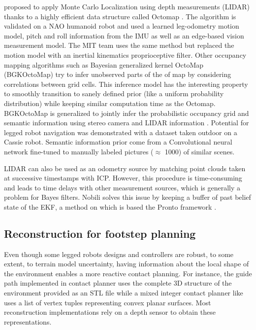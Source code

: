 \cite{hornung2014monte} proposed to apply Monte Carlo Localization using depth measurements (LIDAR) thanks to a highly efficient data structure called Octomap \cite{hornung2013octomap}.
The algorithm is validated on a NAO humanoid robot and used a learned leg-odometry motion model, pitch and roll information from the IMU as well as an edge-based vision measurement model.
The MIT team \cite{fallon2014drift} uses the same method but replaced the motion model with an inertial kinematics proprioceptive filter. Other occupancy mapping algorithms 
such as Bayesian generalized kernel OctoMap (BGKOctoMap) \cite{doherty2017bayesian} try to infer unobserved parts of the of map by considering correlations between grid cells. This inference model
has the interesting property to smoothly transition to sanely defined prior (like a uniform probability distribution) while keeping similar computation time as the Octomap.
BGKOctoMap is generalized to jointly infer the probabilistic occupancy grid and semantic information using stereo camera and LIDAR information \cite{gan2020bayesian}. 
Potential for legged robot navigation was demonstrated with a dataset taken outdoor on a Cassie robot.  
Semantic information prior come from a Convolutional neural network fine-tuned to manually labeled pictures ($\approx$ 1000) of similar scenes.


LIDAR can also be used as an odometry source by matching point clouds taken at successive timestamps with ICP. However, this procedure is time-consuming 
and leads to time delays with other measurement sources, which is generally a problem for Bayes filters. 
Nobili \cite{nobili2017heterogeneous} solves this issue by keeping a buffer of past belief state of the EKF, a method on which is 
based the Pronto framework \cite{camurri2020pronto}.




\subsection{Reconstruction for footstep planning}
Even though some legged robots designs and controllers \cite{reher2019dynamic, bledt2018cheetah} are robust, to some extent, to terrain model uncertainty, having information about the local
shape of the environment enables a more reactive contact planning. For instance, the guide path implemented in contact planner \cite{tonneau2018efficient} uses the complete 3D structure of the environment
provided as an STL file while a mixed integer contact planner like \cite{tonneau2020sl1m} uses a list of vertex tuples representing convex planar surfaces.
Most reconstruction implementations rely on a depth sensor to obtain these representations.

